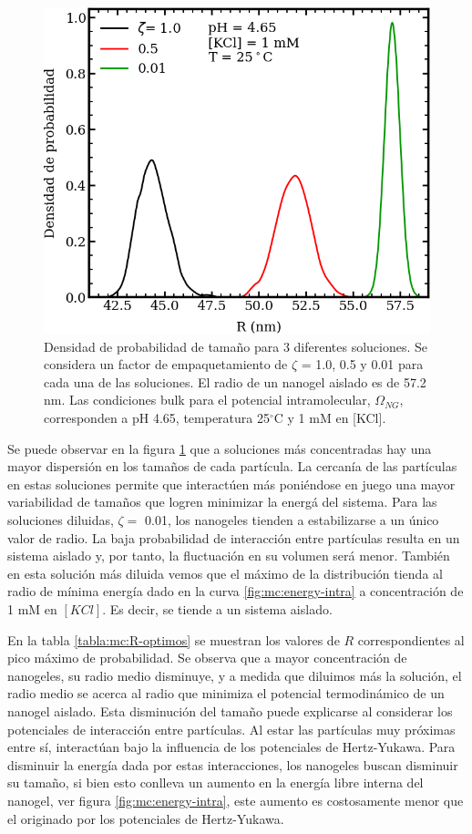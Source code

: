 	\begin{figure}
		\centering
		\includegraphics[width=0.45\linewidth]{Figures/graph-mc/size-zetas.png}
		\caption{Densidad de probabilidad de tama\~no para 3 diferentes soluciones. Se considera un factor de empaquetamiento de $\zeta$ = 1.0, 0.5 y 0.01 para cada una de las soluciones. El radio de un nanogel aislado es de 57.2 nm. Las condiciones bulk para el potencial intramolecular, $\Omega_{NG}$, corresponden a pH 4.65, temperatura 25$^\circ$C y 1 mM en [KCl].}
		\label{fig:mc:densidad-probabilidad}
	\end{figure}
	
	Se puede observar en la figura \ref{fig:mc:densidad-probabilidad} que a soluciones m\'as concentradas hay una mayor dispersi\'on en los tama\~nos de cada part\'icula. La cercan\'ia de las part\'iculas en estas soluciones permite que interact\'uen m\'as poni\'endose en juego una mayor variabilidad de tama\~nos que logren minimizar la energ\'a del sistema.
	Para las soluciones diluidas, $\zeta =$ 0.01, los nanogeles tienden a estabilizarse a un \'unico valor de radio. La baja probabilidad de interacci\'on entre part\'iculas resulta en un sistema aislado y, por tanto, la fluctuaci\'on en su volumen ser\'a menor.
	Tambi\'en en esta soluci\'on m\'as diluida vemos que el m\'aximo de la distribuci\'on tienda al radio de m\'inima energ\'ia dado en la curva \ref{fig:mc:energy-intra} a concentración de 1 mM en  $[KCl]$. Es decir, se tiende a un sistema aislado.
	
	En la tabla \ref{tabla:mc:R-optimos} se muestran los valores de $R$ correspondientes al pico m\'aximo de probabilidad. Se observa que a mayor concentraci\'on de nanogeles, su radio medio disminuye, y a medida que diluimos m\'as la soluci\'on, el radio medio se acerca al radio que minimiza el potencial termodin\'amico de un nanogel aislado.
	Esta disminuci\'on del tama\~no puede explicarse al considerar los potenciales de interacci\'on entre part\'iculas. Al estar las part\'iculas muy pr\'oximas entre s\'i, interact\'uan bajo la influencia de los potenciales de Hertz-Yukawa. Para disminuir la energ\'ia dada por estas interacciones, los nanogeles buscan disminuir su tama\~no, si bien esto conlleva un aumento en la energ\'ia libre interna del nanogel, ver figura \ref{fig:mc:energy-intra}, este aumento es costosamente menor que el originado por los potenciales de Hertz-Yukawa.
	
